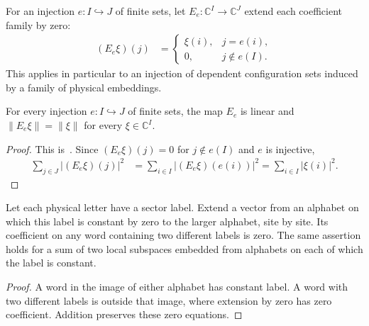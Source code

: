 \begin{definition}
    \label{def:physical_euclidean_extension_zero}
    \leanok
    For an injection $e:I\hookrightarrow J$ of finite sets, let
    $E_e:\mathbb C^I\to\mathbb C^J$ extend each coefficient family by zero:
    \begin{align}
        (E_e\xi)(j) & =
        \begin{cases}
            \xi(i), & j=e(i),       \\
            0,      & j\notin e(I).
        \end{cases}
    \end{align}
    This applies in particular to an injection of dependent configuration
    sets induced by a family of physical embeddings.
\end{definition}

\begin{lemma}
    \label{lem:physical_euclidean_extension_zero_isometry}
    \leanok
    For every injection $e:I\hookrightarrow J$ of finite sets, the map $E_e$
    is linear and $\lVert E_e\xi\rVert=\lVert\xi\rVert$ for every
    $\xi\in\mathbb C^I$.
\end{lemma}
\begin{proof}
    \leanok
    This is~\cite[``Extension by zero is an isometry'']{QICLean2026Blueprint}.
    Since $(E_e\xi)(j)=0$ for $j\notin e(I)$ and $e$ is injective,
    \begin{align}
        \sum_{j\in J}\lvert(E_e\xi)(j)\rvert^2
         & =\sum_{i\in I}\lvert(E_e\xi)(e(i))\rvert^2
        =\sum_{i\in I}\lvert\xi(i)\rvert^2.
    \end{align}
\end{proof}

\begin{lemma}
    \label{lem:physical_sector_embedded_coefficients}
    \leanok
    Let each physical letter have a sector label. Extend a vector from an
    alphabet on which this label is constant by zero to the larger alphabet,
    site by site. Its coefficient on any word containing two different
    labels is zero. The same assertion holds for a sum of two local subspaces
    embedded from alphabets on each of which the label is constant.
\end{lemma}
\begin{proof}
    \leanok
    A word in the image of either alphabet has constant label. A word with
    two different labels is outside that image, where extension by zero
    has zero coefficient. Addition preserves these zero equations.
\end{proof}


